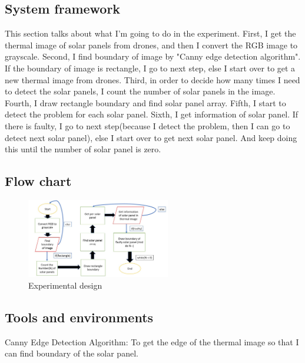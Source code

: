 \documentclass[11pt,twocolumn,letterpaper]{article}
\begin{document}
\begin{CJK*}{UTF8}{bsmi}
\section{System framework}
This section talks about what I'm going to do in the experiment. First, I get the thermal image of solar panels from drones, and then I convert the RGB image to grayscale. Second, I find boundary of image by "Canny edge detection algorithm". If the boundary of image is rectangle, I go to next step, else I start over to get a new thermal image from drones. Third, in order to decide how many times I need to detect the solar panels, I count the number of solar panels in the image. Fourth, I draw rectangle boundary and find solar panel array. Fifth, I start to detect the problem for each solar panel. Sixth, I get information of solar panel. If there is faulty, I go to next step(because I detect the problem, then I can go to detect next solar panel), else I start over to get next solar panel. And keep doing this until the number of solar panel is zero. 



\subsection{Flow chart}
\begin{figure}[H] %
\centering %
\includegraphics[width=0.56\textwidth]{flowchart.jpg} %
\caption{Experimental design} %
\label{Fig.main2} %
\end{figure}


\subsection{Tools and environments}
Canny Edge Detection Algorithm: To get the edge of the thermal image so that I can find boundary of the solar panel.


\end{CJK*}
\end{document}
